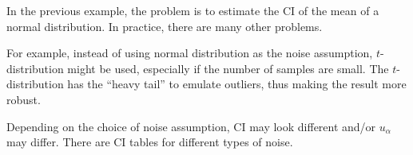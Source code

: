 In the previous example, the problem is to estimate the CI of the mean of a normal distribution. In practice, there are many other problems. 

For example, instead of using normal distribution as the noise assumption, $t$-distribution might be used, especially if the number of samples are small. The $t$-distribution has the ``heavy tail'' to emulate outliers, thus making the result more robust.

Depending on the choice of noise assumption, CI may look different and/or $u_{\alpha}$ may differ. There are CI tables for different types of noise.
